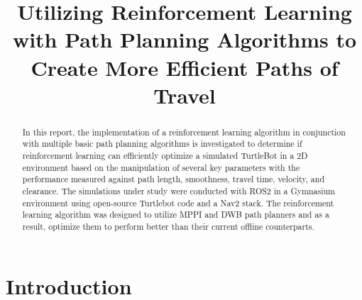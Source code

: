 \documentclass[conference]{IEEEtran}
\begin{document}
\title{Utilizing Reinforcement Learning with Path Planning Algorithms to Create More Efficient Paths of Travel\\
}

\author{
\and
{}
\and
{}
}

\maketitle

\begin{abstract}
In this report, the implementation of a reinforcement learning algorithm in conjunction with multiple basic path planning algorithms is investigated
to determine if reinforcement learning can efficiently optimize a simulated TurtleBot in a 2D environment based on the manipulation of several key
parameters with the performance measured against path length, smoothness, travel time, velocity, and clearance. The simulations under study were
conducted with ROS2 in a Gymnasium environment using open-source Turtlebot code and a Nav2 stack. The reinforcement learning algorithm was designed to
utilize MPPI and DWB path planners and as a result, optimize them to perform better than their current offline counterparts.
\end{abstract}


\section{Introduction}
\end{document}

